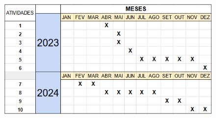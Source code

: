 \FloatBarrier
\begin{figure}[!htbp]
	\centering
	\includegraphics[scale=0.8]{imagens/Cronograma.png}
\end{figure}
\FloatBarrier


